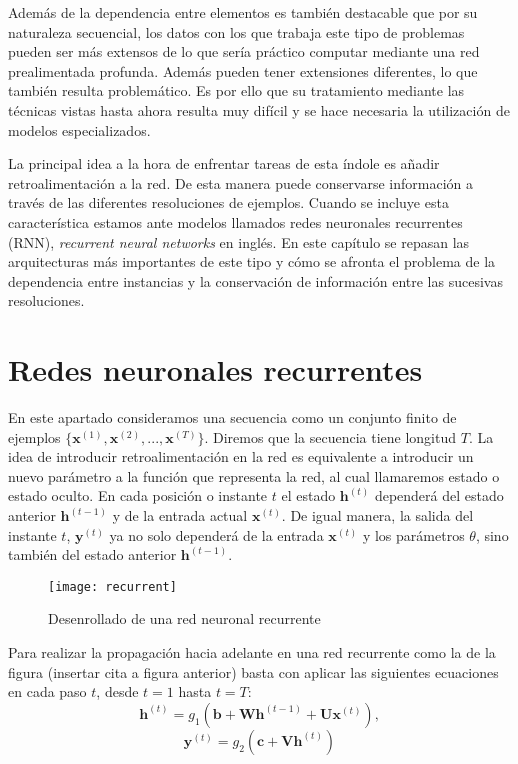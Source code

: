 Además de la dependencia entre elementos es también destacable que por su naturaleza secuencial, los datos con los que trabaja este tipo de problemas pueden ser más extensos de lo que sería práctico computar mediante una red prealimentada profunda. Además pueden tener extensiones diferentes, lo que también resulta problemático. Es por ello que su tratamiento mediante las técnicas vistas hasta ahora resulta muy difícil y se hace necesaria la utilización de modelos especializados.

La principal idea a la hora de enfrentar tareas de esta índole es añadir retroalimentación a la red. De esta manera puede conservarse información a través de las diferentes resoluciones de ejemplos. Cuando se incluye esta característica estamos ante modelos llamados redes neuronales recurrentes (RNN), \textit{recurrent neural networks} en inglés. En este capítulo se repasan las arquitecturas más importantes de este tipo y cómo se afronta el problema de la dependencia entre instancias y la conservación de información entre las sucesivas resoluciones.

\section{Redes neuronales recurrentes}

En este apartado consideramos una secuencia como un conjunto finito de ejemplos $\{\textbf{x}^{(1)},\textbf{x}^{(2)},...,\textbf{x}^{(T)}\}$. Diremos que la secuencia tiene longitud $T$. La idea de introducir retroalimentación en la red es equivalente a introducir un nuevo parámetro a la función que representa la red, al cual llamaremos estado o estado oculto. En cada posición o instante $t$ el estado $\textbf{h}^{(t)}$ dependerá del estado anterior $\textbf{h}^{(t-1)}$ y de la entrada actual $\textbf{x}^{(t)}$. De igual manera, la salida del instante $t$, $\textbf{y}^{(t)}$ ya no solo dependerá de la entrada $\textbf{x}^{(t)}$ y los parámetros $\theta$, sino también del estado anterior $\textbf{h}^{(t-1)}$.

\begin{figure}[htpb]
  \centering
  \texttt{[image: recurrent]}
  \caption{Desenrollado de una red neuronal recurrente}
  \label{fig:recurrent}
\end{figure}

Para realizar la propagación hacia adelante en una red recurrente como la de la figura (insertar cita a figura anterior) basta con aplicar las siguientes ecuaciones en cada paso $t$, desde $t=1$ hasta $t=T$:
$$\textbf{h}^{(t)} = g_1(\textbf{b} + \textbf{W}\textbf{h}^{(t-1)} + \textbf{U}\textbf{x}^{(t)}), $$
$$\textbf{y}^{(t)} = g_2(\textbf{c} + \textbf{V}\textbf{h}^{(t)}) $$

